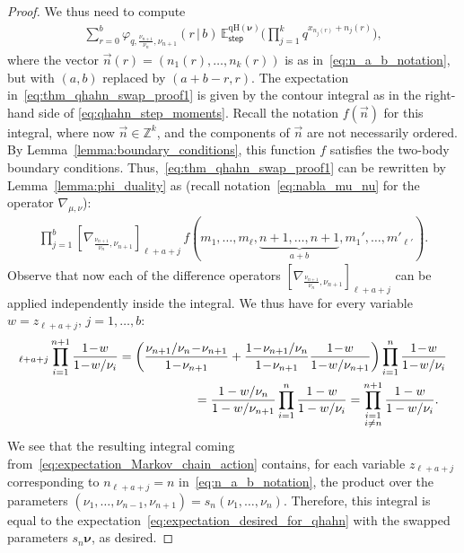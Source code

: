 \begin{proof}
	We thus need to compute
	\begin{gather}
		\label{eq:thm_qhahn_swap_proof1}
		\sum_{r=0}^{b}
		\varphi_{q,\frac{\nu_{n+1}}{\nu_n},\nu_{n+1}}
		(r\,|\, b)
		\,\mathbb{E}^{\mathrm{qH}(\boldsymbol\nu)}_{\mathsf{step}}
		\biggl(\prod_{j=1}^{k}
		q^{x_{n_j(r)}+n_j(r)}\biggr),
	\end{gather}
	where the vector
	$\vec n(r)=(n_1(r),\ldots,n_k(r) )$
	is as in~\eqref{eq:n_a_b_notation},
	but with $(a,b)$ replaced by $(a+b-r,r)$.
	The expectation in~\eqref{eq:thm_qhahn_swap_proof1}
	is given by the contour integral as in the right-hand side of
	\eqref{eq:qhahn_step_moments}.
	Recall the notation $f(\vec n)$ for this integral, where now $\vec n\in \mathbb{Z}^k$,
	and the components of $\vec n$ are not necessarily ordered.
	By Lemma~\ref{lemma:boundary_conditions}, this function $f$ satisfies the two-body boundary conditions.
	Thus,~\eqref{eq:thm_qhahn_swap_proof1} can be rewritten by Lemma~\ref{lemma:phi_duality}
	as (recall notation~\eqref{eq:nabla_mu_nu} for
	the operator
	$\nabla_{\mu,\nu}$):
	\begin{gather*}
		\prod_{j=1}^{b}\left[ \nabla_{\frac{\nu_{n+1}}{\nu_n},\nu_{n+1}} \right]_{\ell+a+j}\,
		f(m_1,\ldots,m_\ell,\underbrace{n+1,\ldots,n+1 }_{a+b},m_1',\ldots,m'_{\ell'}).
	\end{gather*}
	Observe that now
	each of the difference operators
	$[ \nabla_{\frac{\nu_{n+1}}{\nu_n},\nu_{n+1}} ]_{\ell+a+j}$
	can be applied independently
	inside the integral. We thus have for every variable $w=z_{\ell+a+j}$,
	$j=1,\ldots,b $:
	\begin{gather*}
	[\nabla_{\frac{\nu_{n+1}}{\nu_n},\nu_{n+1}}]_{\ell+a+j}
	\prod_{i=1}^{n+1}\frac{1\!-\!w}{1\!-\!w/\nu_i}
	=	\bigg( \frac{\nu_{n+1}/\nu_n\!-\!\nu_{n+1}}{1\!-\!\nu_{n+1}}+
	\frac{1\!-\!\nu_{n+1}/\nu_n}{1\!-\!\nu_{n+1}}\frac{1\!-\!w}{1\!-\!w/\nu_{n+1}} \bigg)
	\prod_{i=1}^{n}\frac{1\!-\!w}{1\!-\!w/\nu_i}
	\\ \hphantom{[\nabla_{\frac{\nu_{n+1}}{\nu_n},\nu_{n+1}}]_{\ell+a+j}
	\prod_{i=1}^{n+1}\frac{1\!-\!w}{1\!-\!w/\nu_i}}
{}=	\frac{1-w/\nu_n}{1-w/\nu_{n+1}}	\prod_{i=1}^{n}\frac{1-w}{1-w/\nu_i}
	=\prod_{\substack{i=1\\i\ne n}}^{n+1}\frac{1-w}{1-w/\nu_i}.
	\end{gather*}
	We see that the
	resulting integral coming from~\eqref{eq:expectation_Markov_chain_action}
	contains, for each variable
	$z_{\ell+a+j}$ corresponding to $n_{\ell+a+j}=n$ in~\eqref{eq:n_a_b_notation}, the product over the
	parameters $(\nu_1,\ldots,\nu_{n-1},\nu_{n+1} )=s_n(\nu_1,\ldots,\nu_{n} )$.
	Therefore, this integral is equal to the
	expectation~\eqref{eq:expectation_desired_for_qhahn}
	with the swapped parameters $s_n\boldsymbol\nu$, as desired.


\end{proof}
